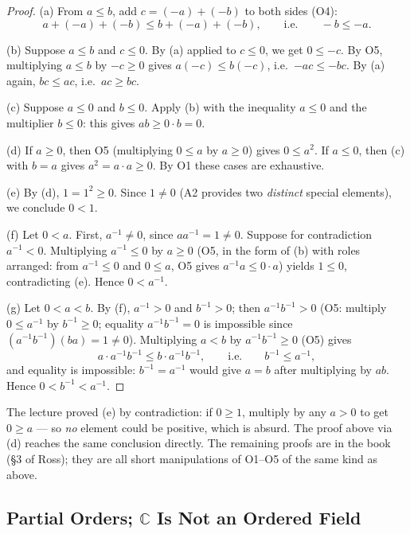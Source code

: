 \documentclass[11pt]{report}
\begin{document}
\begin{proof}
(a) From $a \leq b$, add $c = (-a) + (-b)$ to both sides (O4):
\[
a + (-a) + (-b) \leq b + (-a) + (-b), \qquad \text{i.e.} \qquad -b \leq -a.
\]

(b) Suppose $a \leq b$ and $c \leq 0$. By (a) applied to $c \leq 0$, we get $0 \leq -c$. By O5, multiplying $a \leq b$ by $-c \geq 0$ gives $a(-c) \leq b(-c)$, i.e.\ $-ac \leq -bc$. By (a) again, $bc \leq ac$, i.e.\ $ac \geq bc$.

(c) Suppose $a \leq 0$ and $b \leq 0$. Apply (b) with the inequality $a \leq 0$ and the multiplier $b \leq 0$: this gives $ab \geq 0 \cdot b = 0$.

(d) If $a \geq 0$, then O5 (multiplying $0 \leq a$ by $a \geq 0$) gives $0 \leq a^2$. If $a \leq 0$, then (c) with $b = a$ gives $a^2 = a \cdot a \geq 0$. By O1 these cases are exhaustive.

(e) By (d), $1 = 1^2 \geq 0$. Since $1 \neq 0$ (A2 provides two \emph{distinct} special elements), we conclude $0 < 1$.

(f) Let $0 < a$. First, $a^{-1} \neq 0$, since $a a^{-1} = 1 \neq 0$. Suppose for contradiction $a^{-1} < 0$. Multiplying $a^{-1} \leq 0$ by $a \geq 0$ (O5, in the form of (b) with roles arranged: from $a^{-1} \leq 0$ and $0 \leq a$, O5 gives $a^{-1} a \leq 0 \cdot a$) yields $1 \leq 0$, contradicting (e). Hence $0 < a^{-1}$.

(g) Let $0 < a < b$. By (f), $a^{-1} > 0$ and $b^{-1} > 0$; then $a^{-1} b^{-1} > 0$ (O5: multiply $0 \leq a^{-1}$ by $b^{-1} \geq 0$; equality $a^{-1}b^{-1} = 0$ is impossible since $(a^{-1}b^{-1})(ba) = 1 \neq 0$). Multiplying $a < b$ by $a^{-1} b^{-1} \geq 0$ (O5) gives
\[
a \cdot a^{-1} b^{-1} \leq b \cdot a^{-1} b^{-1}, \qquad \text{i.e.} \qquad b^{-1} \leq a^{-1},
\]
and equality is impossible: $b^{-1} = a^{-1}$ would give $a = b$ after multiplying by $ab$. Hence $0 < b^{-1} < a^{-1}$.
\end{proof}

\begin{rembox}
The lecture proved (e) by contradiction: if $0 \geq 1$, multiply by any $a > 0$ to get $0 \geq a$ --- so \emph{no} element could be positive, which is absurd. The proof above via (d) reaches the same conclusion directly. The remaining proofs are in the book (\S 3 of Ross); they are all short manipulations of O1--O5 of the same kind as above.
\end{rembox}

\subsection{Partial Orders; $\mathbb{C}$ Is Not an Ordered Field}
\end{document}
